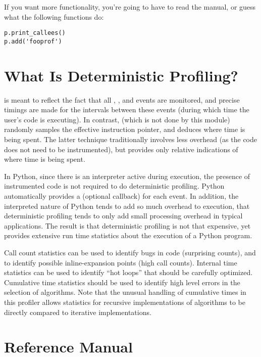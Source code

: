 If you want more functionality, you're going to have to read the
manual, or guess what the following functions do:

\bcode\begin{verbatim}
p.print_callees()
p.add('fooprof')
\end{verbatim}\ecode
%
\section{What Is Deterministic Profiling?}

 is meant to reflect the fact that all
, , and  events
are monitored, and precise timings are made for the intervals between
these events (during which time the user's code is executing).  In
contrast,  (which is not done by this
module) randomly samples the effective instruction pointer, and
deduces where time is being spent.  The latter technique traditionally
involves less overhead (as the code does not need to be instrumented),
but provides only relative indications of where time is being spent.

In Python, since there is an interpreter active during execution, the
presence of instrumented code is not required to do deterministic
profiling.  Python automatically provides a  (optional
callback) for each event.  In addition, the interpreted nature of
Python tends to add so much overhead to execution, that deterministic
profiling tends to only add small processing overhead in typical
applications.  The result is that deterministic profiling is not that
expensive, yet provides extensive run time statistics about the
execution of a Python program.

Call count statistics can be used to identify bugs in code (surprising
counts), and to identify possible inline-expansion points (high call
counts).  Internal time statistics can be used to identify ``hot
loops'' that should be carefully optimized.  Cumulative time
statistics should be used to identify high level errors in the
selection of algorithms.  Note that the unusual handling of cumulative
times in this profiler allows statistics for recursive implementations
of algorithms to be directly compared to iterative implementations.


\section{Reference Manual}

